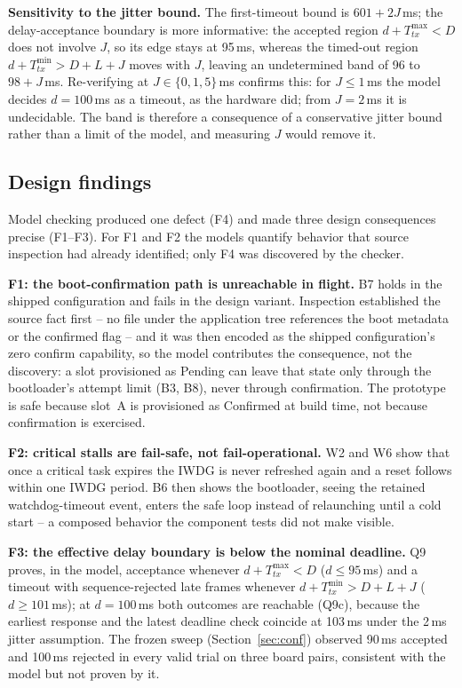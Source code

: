 \documentclass[conference,a4paper]{IEEEtran}
\begin{document}
\textbf{Sensitivity to the jitter bound.} The first-timeout bound is $601+2J$\,ms; the delay-acceptance boundary is more informative: the accepted region $d+T_{tx}^{\max}<D$ does not involve $J$, so its edge stays at 95\,ms, whereas the timed-out region $d+T_{tx}^{\min}>D{+}L{+}J$ moves with $J$, leaving an undetermined band of 96 to $98{+}J$\,ms. Re-verifying at $J \in \{0,1,5\}$\,ms confirms this: for $J \le 1$\,ms the model decides $d = 100$\,ms as a timeout, as the hardware did; from $J = 2$\,ms it is undecidable. The band is therefore a consequence of a conservative jitter bound rather than a limit of the model, and measuring $J$ would remove it.


\subsection{Design findings}
\label{sec:findings}
Model checking produced one defect (F4) and made three design consequences precise (F1--F3). For F1 and F2 the models quantify behavior that source inspection had already identified; only F4 was discovered by the checker.

\textbf{F1: the boot-confirmation path is unreachable in flight.} B7 holds in the shipped configuration and fails in the design variant. Inspection established the source fact first -- no file under the application tree references the boot metadata or the confirmed flag -- and it was then encoded as the shipped configuration's zero confirm capability, so the model contributes the consequence, not the discovery: a slot provisioned as Pending can leave that state only through the bootloader's attempt limit (B3, B8), never through confirmation. The prototype is safe because slot~A is provisioned as Confirmed at build time, not because confirmation is exercised.

\textbf{F2: critical stalls are fail-safe, not fail-operational.} W2 and W6 show that once a critical task expires the IWDG is never refreshed again and a reset follows within one IWDG period. B6 then shows the bootloader, seeing the retained watchdog-timeout event, enters the safe loop instead of relaunching until a cold start -- a composed behavior the component tests did not make visible.

\textbf{F3: the effective delay boundary is below the nominal deadline.} Q9 proves, in the model, acceptance whenever $d+T_{tx}^{\max}<D$ ($d\le95$\,ms) and a timeout with sequence-rejected late frames whenever $d+T_{tx}^{\min}>D+L+J$ ($d\ge101$\,ms); at $d=100$\,ms both outcomes are reachable (Q9c), because the earliest response and the latest deadline check coincide at 103\,ms under the 2\,ms jitter assumption. The frozen sweep (Section~\ref{sec:conf}) observed 90\,ms accepted and 100\,ms rejected in every valid trial on three board pairs, consistent with the model but not proven by it.
\end{document}
